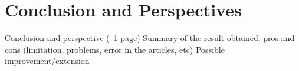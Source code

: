 \section{Conclusion and Perspectives}

Conclusion and perspective (~1 page)
Summary of the result obtained: pros and cons (limitation, problems, error in the articles, etc)
Possible improvement/extension
